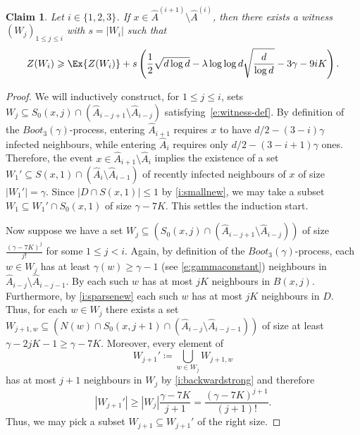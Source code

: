 \documentclass[reqno,a4paper,11pt]{amsart}
\newtheorem{claim}[theorem]{Claim}
\theoremstyle{definition}
\renewcommand{\leq}{\leqslant}
\renewcommand{\geq}{\geqslant}
\begin{document}
\begin{claim}\label{c:existencewitness}
  Let $i \in \{1,2,3\}$.
  If $x \in \hat{A}^{(i+1)} \setminus \hat{A}^{(i)}$, then there exists a witness $(W_j)_{1 \leq j \leq i}$ with $s=|W_i|$ such that
  \begin{equation}\label{e:0-statement-dev}
    Z(W_i) \geq \Ex{Z(W_i)} + s\left(\frac{1}{2} \sqrt{d \log d} - \lambda \log \log d\sqrt{\frac{d}{\log d}}-3 \gamma - 9iK\right).
  \end{equation}
\end{claim}
\begin{proof}
  We will inductively construct, for $1 \leq j \leq i$, sets $W_j\subseteq S_0(x, j) \cap \left(\hat{A}_{i-j+1} \setminus \hat{A}_{i-j}\right)$ satisfying~\eqref{e:witness-def}.
  By definition of the $Boot_3(\gamma)$-process, entering $\hat{A}_{i+1}$ requires $x$ to have $d/2 - (3-i)\gamma$ infected neighbours, while entering $\hat{A}_i$ requires only $d/2 - (3-i+1)\gamma$ ones.
  Therefore, the event $x \in \hat{A}_{i+1} \setminus \hat{A}_i$ implies the existence of a set $W_1' \subseteq S(x, 1) \cap \left(\hat{A}_i \setminus \hat{A}_{i-1}\right)$ of recently infected neighbours of $x$ of size $|W_1'|=\gamma$.
  Since $|D \cap S(x, 1)|\leq 1$ by \ref{i:smallnew}, we may take a subset $W_1 \subseteq W_1' \cap S_0(x,1)$ of size $\gamma - 7K$.
  This settles the induction start.

  Now suppose we have a set $W_j \subseteq \left(S_0(x, j) \cap \left(\hat{A}_{i-j+1} \setminus \hat{A}_{i-j}\right)\right)$ of size $\frac{(\gamma - 7K)^j}{j!}$ for some $1 \leq j < i$.
  Again, by definition of the $Boot_3(\gamma)$-process, each $w \in W_j$ has at least $\gamma(w) \geq \gamma - 1$ (see \eqref{e:gammaconstant}) neighbours in $\hat{A}_{i-j} \setminus \hat{A}_{i-j-1}$.
  By  each such $w$ has at most $jK$ neighbours in $B(x, j)$.
  Furthermore, by \ref{i:sparsenew} each such $w$ has at most $jK$ neighbours in $D$.
  Thus, for each $w \in W_j$ there exists a set $W_{j+1, w} \subseteq \left(N(w) \cap S_0(x, j+1) \cap \left(\hat{A}_{i-j} \setminus \hat{A}_{i-j-1}\right)\right)$ of size at least $\gamma - 2jK -1 \geq \gamma - 7K$.
  Moreover, every element of
  \[
    W_{j+1}' \coloneqq \bigcup_{w \in W_j} W_{j+1, w}
  \]
  has at most $j+1$ neighbours in $W_j$ by \ref{i:backwardstrong} and therefore
  \[
    |W_{j+1}'| \geq |W_j| \frac{\gamma-7K}{j+1} = \frac{(\gamma-7K)^{j+1}}{(j+1)!}.
  \]
  Thus, we may pick a subset $W_{j+1} \subseteq W_{j+1}'$ of the right size.


\end{proof}
\end{document}
